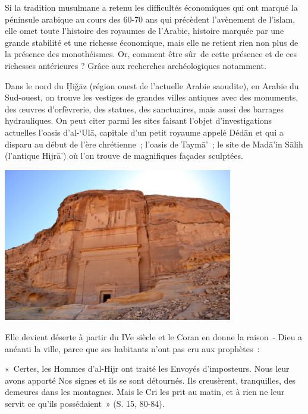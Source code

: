 Si la tradition musulmane a retenu les difficultés économiques qui ont
marqué la péninsule arabique au cours des 60-70 ans qui précèdent
l'avènement de l'islam, elle omet toute l'histoire des royaumes de
l'Arabie, histoire marquée par une grande stabilité et une richesse
économique, mais elle ne retient rien non plus de la présence des
monothéismes. Or, comment être sûr~de cette présence et de ces richesses
antérieures ? Grâce aux recherches archéologiques notamment.


Dans le nord du Ḥiǧāz (région ouest de l'actuelle Arabie saoudite), en
Arabie du Sud-ouest, on trouve les vestiges de grandes villes antiques
avec des monuments, des œuvres d'orfèvrerie, des statues, des
sanctuaires, mais aussi des barrages hydrauliques. On peut citer parmi
les sites faisant l'objet d'investigations actuelles l'oasis d'al-`Ulā,
capitale d'un petit royaume appelé Dédān et qui a disparu au début de
l'ère chrétienne~; l'oasis de Taymā'~; le site de Madā'in Sālih
(l'antique Hijrā') où l'on trouve de magnifiques façades sculptées.

\includegraphics[width=3.94921in,height=2.63264in]{Images/image028.jpg}

Elle devient déserte à partir du IVe siècle et le Coran en donne la
raison~- Dieu a anéanti la ville, parce que ses habitants n'ont pas cru
aux prophètes~:

«~Certes, les Hommes d'al-Hijr ont traité les Envoyés d'imposteurs. Nous
leur avons apporté Nos signes et ils se sont détournés. Ils creusèrent,
tranquilles, des demeures dans les montagnes. Mais le Cri les prit au
matin, et à rien ne leur servit ce qu'ils possédaient~» (S. 15,
80-84).


